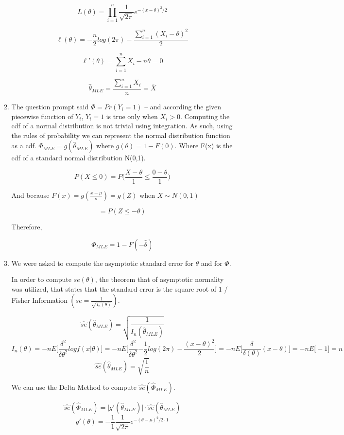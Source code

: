 \documentclass[letterpaper]{article}
\begin{document}
\begin{enumerate}
\begin{enumerate}
$$ L(\theta) = \prod\limits_{i=1}^{n} \frac{1}{\sqrt{2\pi}} e^{-(x - \theta)^{2}/2} $$

$$ \ell(\theta) = -\frac{n}{2} log(2\pi) - \frac{\sum\limits_{i=1}^{n} (X_{i} - \theta)^{2}} {2} $$

$$ \ell'(\theta) = \sum\limits^{n}_{i=1} X_{i} - n\theta = 0 $$

$$ \hat{\theta}_{MLE} = \frac{\sum\limits^{n}_{i=1} X_{i}}{n} = \bar{X} $$ 

\item The question prompt said $\Phi = Pr(Y_{i} = 1)$ -- and according the given piecewise function of $Y_{i}$, $Y_{i} = 1$ is true only when $X_{i} > 0$. Computing the cdf of a normal distribution is not trivial using integration. As such, using the rules of probability we can represent the normal distribution function as a cdf. $\Phi_{MLE} = g(\hat{\theta}_{MLE})$ where $g(\theta)= 1 - F(0)$. Where F(x) is the cdf of a standard normal distribution N(0,1). 


$$ P (X \leq 0) = P \Bigg( \frac{X - \theta}{1} \leq \frac{0 - \theta}{1} \Bigg) $$

And because $F(x) = g(\frac{x-\mu}{\sigma}) = g(Z)$ when $X \sim N(0,1)$

$$= P (Z \leq {-\theta})$$

Therefore,

$$ \Phi_{MLE} = 1 - F(-\hat{{\theta}}) $$

\item We were asked to compute the asymptotic standard error for $\theta$ and for $\Phi$. 

In order to compute $se(\theta)$, the theorem that of asymptotic normality was utilized, that states that the standard error is the square root of 1 / Fisher Information $(se = \frac{1}{\sqrt{I_{n}(\theta)}}).$


$$ \hat{se}(\hat{\theta}_{MLE}) = \sqrt{\frac{1}{I_{n}(\hat{\theta}_{MLE})}} $$
$$ I_{n}(\theta) = -nE \Bigg[ \frac{\delta^{2}}{\delta\theta^{2}} log f(x\vert\theta) \Bigg] = -nE \Bigg[ \frac{\delta^{2}}{\delta\theta^{2}} {-\frac{1}{2}} log (2\pi) - \frac{(x-\theta)^{2}}{2}\Bigg] = -nE \Bigg[ \frac{\delta}{\delta(\theta)} (x-\theta) \Bigg] = -nE \big[-1\big] = n $$
$$\hat{se}(\hat{\theta}_{MLE}) = \sqrt{\frac{1}{n}} $$

We can use the Delta Method to compute $\hat{se}(\hat{\Phi}_{MLE})$. 

$$\hat{se}(\hat{\Phi}_{MLE}) = \big|g'(\hat{\theta}_{MLE})\big| \cdot \hat{se}(\hat{\theta}_{MLE}) $$
$$ g'(\theta) = {-{\frac{1}{1}}} \frac{1}{\sqrt{2\pi}} e^{-(\theta-\mu)^{2} / 2 \cdot 1} $$


\end{enumerate}
\end{enumerate}
\end{document}
